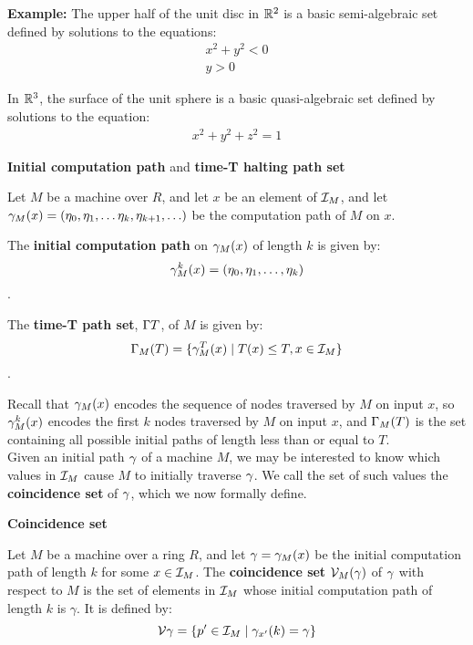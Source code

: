   \textbf{Example: } The upper half of the unit disc in $\mathbb{R}^2$ is
  a basic semi-algebraic set defined by solutions to the equations:
  \begin{eqnarray*}
    x^2 + y^2 < 0\\
    y > 0
  \end{eqnarray*}

  In $\mathbb{R}^3$, the surface of the unit sphere is a basic
  quasi-algebraic set defined by solutions to the equation:
  \begin{eqnarray*}
    x^2 + y^2 + z^2 = 1
  \end{eqnarray*}

  \begin{definition}{\textbf{Initial computation path} and \textbf{time-T halting path set}}

    Let $M$ be a machine over $R$, and let $x$ be an element of
    $\mathcal{I}_M$, and let $\gamma_M(x) = (\eta_0, \eta_1, \ldots
    \eta_k, \eta_{k+1}, \ldots)$ be the computation path of $M$ on
    $x$.
    
    The \textbf{initial computation path} on $\gamma_M(x)$ of
    length $k$ is given by: 
    $$\gamma_M^k(x) = (\eta_0, \eta_1, \ldots,\eta_k)$$.

    The \textbf{time-T path set}, $\Gamma{T}$, of $M$ is given by:
    $$\Gamma_M(T) = \{\gamma_M^T(x) \mid T(x) \leq T, x \in \mathcal{I}_M\}$$.

  \end{definition}

  Recall that $\gamma_M(x)$ encodes the sequence of nodes
  traversed by $M$ on input $x$, so $\gamma_M^k(x)$ encodes the
  first $k$ nodes traversed by $M$ on input $x$, and $\Gamma_M(T)$
  is the set containing all possible initial paths of length less than
  or equal to $T$.  \\

  Given an initial path $\gamma$ of a machine $M$, we may be
  interested to know which values in $\mathcal{I}_M$ cause $M$ to
  initially traverse $\gamma$.  We call the set of such values
  the \textbf{coincidence set} of $\gamma$, which we now
  formally define.
  
  \begin{definition}{\textbf{Coincidence set}}

    Let $M$ be a machine over a ring $R$, and let $\gamma =
    \gamma_M(x)$ be the initial computation path of length $k$
    for some $x \in \mathcal{I}_M$. The \textbf{coincidence set}
    $\mathcal{V}_M(\gamma)$ of $\gamma$ with respect to
    $M$ is the set of elements in $\mathcal{I}_M$ whose initial
    computation path of length $k$ is $\gamma$. It is defined by:
    $$\mathcal{V}{\gamma} = 
    \{p' \in \mathcal{I}_M \mid \gamma_{x'}(k) = \gamma\}$$
    
    \emph{}
  \end{definition}

